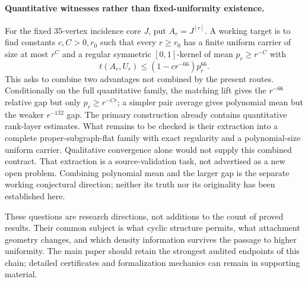 \paragraph{Quantitative witnesses rather than fixed-uniformity existence.}
For the fixed $35$-vertex incidence core $J$, put $A_r=J^{[r]}$.
A working target is to find constants $c,C>0,r_0$ such that every
$r\ge r_0$ has a finite uniform carrier of size at most $r^C$ and a
regular symmetric $[0,1]$-kernel of mean $p_r\ge r^{-C}$ with
\[
 t(A_r,U_r)\le(1-cr^{-66})p_r^{66}.
\]
This asks to combine two advantages not combined by the present routes.
Conditionally on the full quantitative family, the matching lift gives
the $r^{-66}$ relative gap but only $p_r\ge r^{-Cr}$; a simpler pair
average gives polynomial mean but the weaker $r^{-132}$ gap.
The primary construction already
contains quantitative rank-layer estimates.  What remains to be checked
is their extraction into a complete proper-subgraph-flat family with
exact regularity and a polynomial-size uniform carrier.  Qualitative
convergence alone would not supply this combined contract.
That extraction is a source-validation task, not advertised as a new
open problem.  Combining polynomial mean and the larger gap is the
separate working conjectural direction; neither its truth nor its
originality has been established here.

These questions are research directions, not additions to the count of
proved results.  Their common subject is what cyclic structure permits,
what attachment geometry changes, and which density information survives
the passage to higher uniformity.  The main paper should retain the
strongest audited endpoints of this chain; detailed certificates and
formalization mechanics can remain in supporting material.
